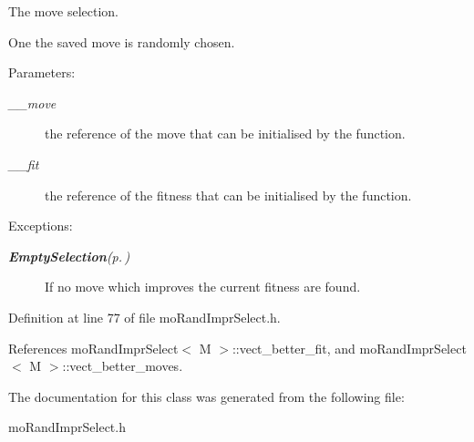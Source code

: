 The move selection. 

One the saved move is randomly chosen.

\begin{Desc}
\item[Parameters:]
\begin{description}
\item[{\em \_\-\_\-move}]the reference of the move that can be initialised by the function. \item[{\em \_\-\_\-fit}]the reference of the fitness that can be initialised by the function. \end{description}
\end{Desc}
\begin{Desc}
\item[Exceptions:]
\begin{description}
\item[{\em {\bf Empty\-Selection}{\rm (p.\,\pageref{class_empty_selection})}}]If no move which improves the current fitness are found. \end{description}
\end{Desc}


Definition at line 77 of file mo\-Rand\-Impr\-Select.h.

References mo\-Rand\-Impr\-Select$<$ M $>$::vect\_\-better\_\-fit, and mo\-Rand\-Impr\-Select$<$ M $>$::vect\_\-better\_\-moves.

The documentation for this class was generated from the following file:\begin{CompactItemize}
\item 
mo\-Rand\-Impr\-Select.h\end{CompactItemize}
